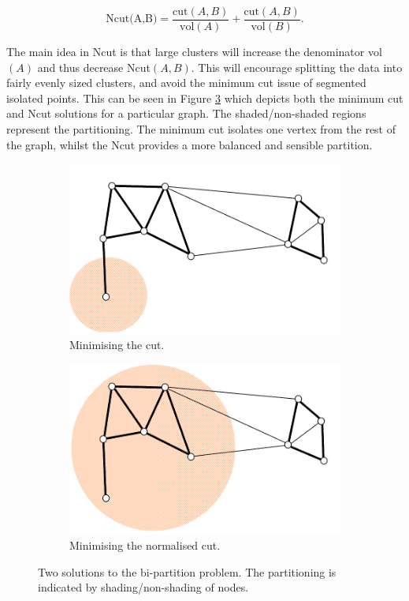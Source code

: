\begin{equation}
  \text{Ncut(A,B)} = \frac{\text{cut}(A, B)}{\text{vol}(A)} + \frac{\text{cut}(A, B)}{\text{vol}(B)}.
    \label{eq:ncut}
\end{equation}

The main idea in Ncut is that large clusters will increase the denominator vol$(A)$ and thus decrease Ncut$(A,B)$. This will encourage splitting the data into fairly evenly sized clusters, and avoid the minimum cut issue of segmented isolated points. This can be seen in Figure \ref{fig:min_norm_cut}  which depicts both the minimum cut and Ncut solutions for a particular graph. The shaded/non-shaded regions represent the partitioning. The minimum cut isolates one vertex from the rest of the graph, whilst the Ncut provides a more balanced and sensible partition. 

\begin{figure}[h!]
  \centering
  \begin{subfigure}{0.4\textwidth}
    \centering
    \includegraphics[width = \textwidth]{my_min_cut.png}
    \caption{Minimising the cut.}
  \label{fig:min_cut}
  \end{subfigure}
  \begin{subfigure}{0.4\textwidth}
    \centering
    \includegraphics[width = \textwidth]{my_norm_cut.png}
  \caption{Minimising the normalised cut.}
  \label{fig:norm_cut}
  \end{subfigure}
  \caption{Two solutions to the bi-partition problem. The partitioning is indicated by shading/non-shading of nodes.}
  \label{fig:min_norm_cut}
\end{figure}

